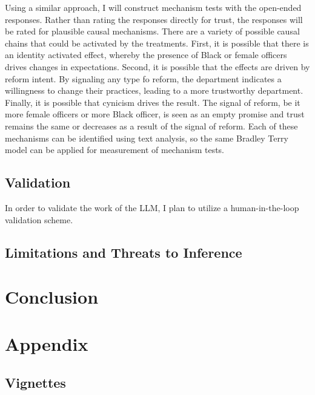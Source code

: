 \documentclass[12pt]{article}
\begin{document}
Using a similar approach, I will construct mechanism tests with the open-ended responses. Rather than rating the responses directly for trust, the responses will be rated for plausible causal mechanisms. There are a variety of possible causal chains that could be activated by the treatments. First, it is possible that there is an identity activated effect, whereby the presence of Black or female officers drives changes in expectations. Second, it is possible that the effects are driven by reform intent. By signaling any type fo reform, the department indicates a willingness to change their practices, leading to a more trustworthy department. Finally, it is possible that cynicism drives the result. The signal of reform, be it more female officers or more Black officer, is seen as an empty promise and trust remains the same or decreases as a result of the signal of reform. Each of these mechanisms can be identified using text analysis, so the same Bradley Terry model can be applied for measurement of mechanism tests. 

\subsection{Validation}

In order to validate the work of the LLM, I plan to utilize a human-in-the-loop validation scheme. 

\subsection{Limitations and Threats to Inference}

\section{Conclusion}


\newpage
\singlespacing
\renewcommand{\refname}{References\vspace{.3cm}}


\appendix

\section*{Appendix}

\subsection*{Vignettes}\label{app:vignette}
\end{document}
